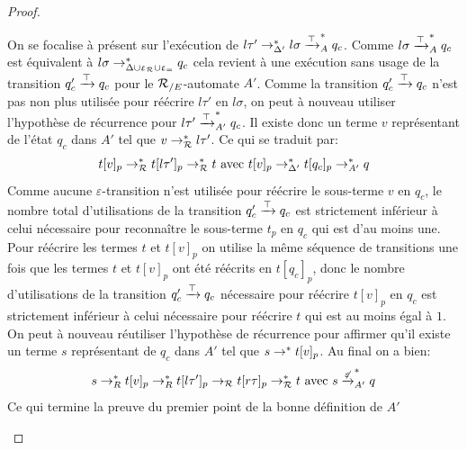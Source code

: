 \begin{proof}
\begin{enumerate}
\begin{itemize}
    On se focalise à présent sur l'exécution de $l\tau'\rightarrow^*_{\Delta'} l\sigma \xrightarrow{\top}^*_{A} q_c$. Comme $l\sigma \xrightarrow{\top}^*_A q_c$
    est équivalent à $l\sigma \rightarrow^*_{\Delta\cup\upvarepsilon_{\mathcal R}\cup\upvarepsilon_{=}} q_c$ cela revient à une exécution sans usage de la transition $q_c'\xrightarrow{\top} q_c$
    pour le ${\mathcal R_{/E}}$-automate $A'$. Comme la transition $q_c'\xrightarrow{\top} q_c$ n'est pas non plus utilisée pour réécrire $l\tau'$ en $l\sigma$,
    on peut à nouveau utiliser l'hypothèse de récurrence pour $l\tau' \xrightarrow{\top}^*_{A'} q_c$. Il existe donc un terme $v$ représentant
    de l'état $q_c$ dans $A'$ tel que $v \rightarrow^*_\mathcal R l\tau'$. Ce qui se traduit par:
    \[t[v]_p \rightarrow^*_\mathcal R t[l\tau']_p \rightarrow^*_\mathcal R t\textrm{ avec }  t[v]_p \rightarrow^*_{\Delta'} t[q_c]_p \rightarrow^*_{\mathit A'} q\]
    Comme aucune $\varepsilon$-transition n'est utilisée pour réécrire le sous-terme $v$ en $q_c$, le nombre
    total d'utilisations de la transition $q_c'\xrightarrow{\top} q_c$ est strictement inférieur à celui nécessaire
    pour reconnaître le sous-terme $t_p$ en $q_c$ qui est d'au moins une. Pour réécrire les termes
    $t$ et $t[v]_p$ on utilise la même séquence de transitions une fois que les termes $t$ et $t[v]_p$
    ont été réécrits en $t[q_c]_p$, donc le nombre d'utilisations de la transition $q_c'\xrightarrow{\top} q_c$
    nécessaire pour réécrire $t[v]_p$ en $q_c$ est strictement inférieur à celui nécessaire pour
    réécrire $t$ qui est au moins égal à $1$. On peut à nouveau réutiliser l'hypothèse de récurrence
    pour affirmer qu'il existe un terme $s$ représentant de $q_c$ dans $A'$ tel que $s \rightarrow^* t[v]_p$.
    Au final on a bien:
    \[s \rightarrow^*_R t[v]_p \rightarrow^*_R t[l\tau']_p \rightarrow_\mathcal R t[r\tau]_p \rightarrow_\mathcal R^* t\textrm{ avec } s \xrightarrow{\not\varepsilon}^*_{A'} q\]
    Ce qui termine la preuve du premier point de la bonne définition de $A'$
  \end{itemize}



\end{enumerate}
\end{proof}
